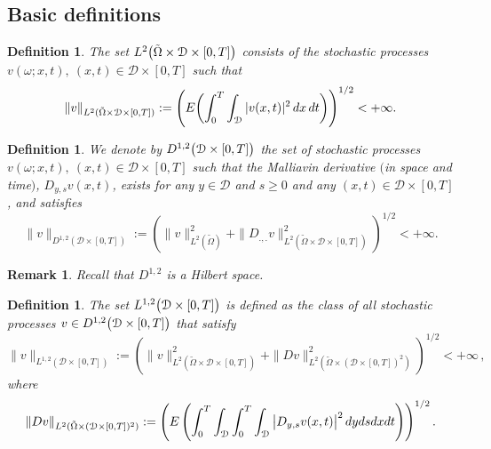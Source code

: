 \documentclass[reqno]{amsart}
\numberwithin{equation}{section}
\newtheorem{definition}[theorem]{Definition}
\newtheorem{remark}[theorem]{Remark}
\newcommand{\Om}{\Omega}
\newcommand{\om}{\omega}
\newcommand{\cd}{\mathcal{D}}
\begin{document}
\allowdisplaybreaks

\subsection{Basic definitions}
\begin{definition}
The set $L^{2}\bigl{(}\tilde{\Omega}\times\cd\times[0,T]\bigr{)}$ consists of the stochastic processes $v(\om;x,t),\ (x,t)\in\cd\times[0,T]$ such that
$$\|v\|_{L^2(\tilde{\Omega}\times\mathcal{D}\times[0,T])} := \left(E\biggl{(}\int_0^T\int_{\mathcal{D}}|v(x,t)|^2\,dx\,dt\biggr{)}\right)^{1/2}<+\infty.$$
\end{definition}

\vspace{0.05cm}

\begin{definition}
We denote by $D^{1,2}\bigl{(}\cd\times[0,T]\bigr{)}$ the set of stochastic processes $v(\om;x,t),\ (x,t)\in\cd\times[0,T]$ such that the Malliavin derivative $($in space and time$)$, $D_{y,s}v(x,t)$, exists for any $y\in\cd$ and $s\geq0$ and any $(x,t)\in\cd\times[0,T]$, and satisfies $$\|v\|_{D^{1,2}(\cd\times[0,T])}:=\left(\|v\|^2_{L^2(\tilde{\Om})}+\|D_{.,.}v\|^{2}_{L^2(\tilde{\Omega}\times\cd\times[0,T])}\right)^{1/2}<+\infty.$$
\end{definition}

\begin{remark}
Recall that  $D^{1,2}$ is a Hilbert space.
\end{remark}
\vspace{0.05cm}
\begin{definition}
The set $L^{1,2}\bigl{(}\cd\times[0,T]\bigr{)}$ is defined as the class of all stochastic processes $v\in D^{1,2}\bigl{(}\cd\times[0,T]\bigr{)}$ that satisfy
$$\|v\|_{L^{1,2}(\cd\times[0,T])}:=\left(\|v\|^2_{L^2(\tilde{\Omega}\times\cd\times[0,T])}+\|Dv\|^2_{L^2(\tilde{\Omega}
\times(\cd\times[0,T])^{2})}\right)^{1/2}<+\infty \,, $$
where
\begin{align*}
\|Dv\|_{L^2(\tilde{\Omega}\times(\cd\times[0,T])^2)}:=
\left(E\left(\int_0^T\int_{\mathcal{D}}\int_0^T\int_{\cd}\big{|}D_{y,s}v(x,t)\big{|}^2\,dydsdxdt\right)\right)^{1/2}.
    \end{align*}
\end{definition}

\vspace{1cm}
\end{document}
